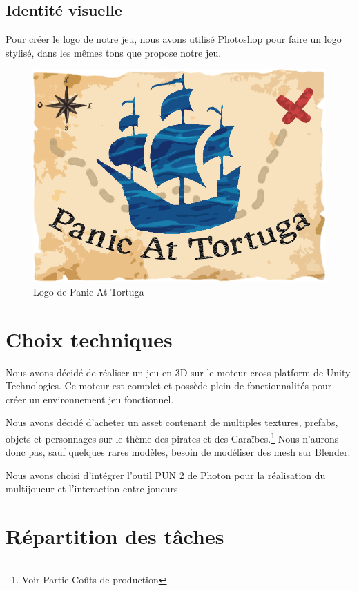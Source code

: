 \documentclass[french, 12pt]{article}
\begin{document}
\subsection{Identité visuelle}
Pour créer le logo de notre jeu, nous avons utilisé Photoshop pour faire un logo stylisé, dans les mêmes tons que propose notre jeu.
\begin{figure}[hbt!]
    \centering
    \includegraphics[scale=0.5]{logo.png}
    \caption{Logo de Panic At Tortuga}
\end{figure}

\section{Choix techniques}

Nous avons décidé de réaliser un jeu en 3D sur le moteur cross-platform de Unity Technologies.
Ce moteur est complet et possède plein de fonctionnalités pour créer un environnement jeu fonctionnel.

Nous avons décidé d'acheter un asset contenant de multiples textures, prefabs, objets et personnages sur le thème des pirates et des Caraïbes.\footnote{Voir Partie Coûts de production}
Nous n'aurons donc pas, sauf quelques rares modèles, besoin de modéliser des mesh sur Blender.

Nous avons choisi d'intégrer l'outil PUN 2 de Photon pour la réalisation du multijoueur et l'interaction entre joueurs.


\newpage
\section{Répartition des tâches}
\end{document}
